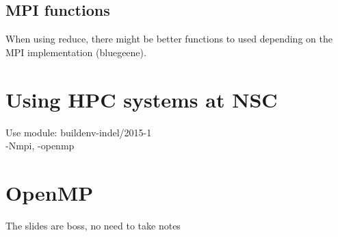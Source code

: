 \documentclass[a4paper]{article}
\begin{document}
\subsection{MPI functions}
When using reduce, there might be better functions to used depending on the
MPI implementation (bluegeene).
\section{Using HPC systems at NSC}
Use module: buildenv-indel/2015-1
\\-Nmpi, -openmp\\
\section{OpenMP}
The slides are boss, no need to take notes
\end{document}
